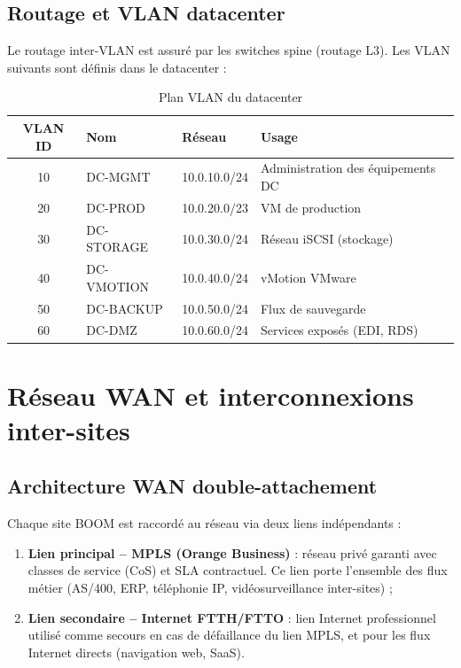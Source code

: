 \documentclass[12pt,a4paper]{report}
\begin{document}
\subsection{Routage et VLAN datacenter}

Le routage inter-VLAN est assuré par les switches spine (routage L3). Les VLAN suivants sont définis dans le datacenter :

\begin{table}[H]
\centering
\begin{tabular}{clll}
\toprule
\textbf{VLAN ID} & \textbf{Nom} & \textbf{Réseau} & \textbf{Usage} \\
\midrule
10 & DC-MGMT & 10.0.10.0/24 & Administration des équipements DC \\
20 & DC-PROD & 10.0.20.0/23 & VM de production \\
30 & DC-STORAGE & 10.0.30.0/24 & Réseau iSCSI (stockage) \\
40 & DC-VMOTION & 10.0.40.0/24 & vMotion VMware \\
50 & DC-BACKUP & 10.0.50.0/24 & Flux de sauvegarde \\
60 & DC-DMZ & 10.0.60.0/24 & Services exposés (EDI, RDS) \\
\bottomrule
\end{tabular}
\caption{Plan VLAN du datacenter}
\label{tab:vlan_dc}
\end{table}

\section{Réseau WAN et interconnexions inter-sites}

\subsection{Architecture WAN double-attachement}

Chaque site BOOM est raccordé au réseau via deux liens indépendants :

\begin{enumerate}
\item \textbf{Lien principal -- MPLS (Orange Business)} : réseau privé garanti avec classes de service (CoS) et SLA contractuel. Ce lien porte l'ensemble des flux métier (AS/400, ERP, téléphonie IP, vidéosurveillance inter-sites) ;
\item \textbf{Lien secondaire -- Internet FTTH/FTTO} : lien Internet professionnel utilisé comme secours en cas de défaillance du lien MPLS, et pour les flux Internet directs (navigation web, SaaS).
\end{enumerate}
\end{document}
